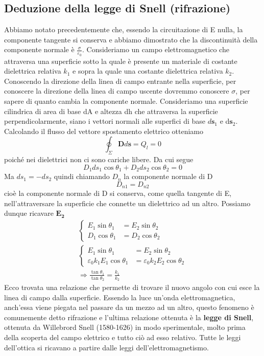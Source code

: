 \documentclass[10pt,a4paper]{article}
\begin{document}
\subsection{Deduzione della legge di Snell (rifrazione)}
Abbiamo notato precedentemente che, essendo la circuitazione di E nulla, la componente tangente si conserva e abbiamo dimostrato che la discontinuità della componente normale è $\frac{\sigma}{\varepsilon_0}$. Consideriamo un campo elettromagnetico che attraversa una superficie sotto la quale è presente un materiale di costante dielettrica relativa \(k_1\) e sopra la quale una costante dielettrica relativa \(k_2\). Conoscendo la direzione della linea di campo entrante nella superficie, per conoscere la direzione della linea di campo uscente dovremmo conoscere $\sigma$, per sapere di quanto cambia la componente normale. Consideriamo una superficie cilindrica di area di base dA e altezza dh che attraversa la superficie perpendicolarmente, siano i vettori normali alle superfici di base \(d\mathbf{s}_1\) e d\(\mathbf{s}_2\). Calcolando il flusso del vettore spostamento elettrico otteniamo
\[\oint_{\Sigma}\mathbf{D}d\mathbf{s} = Q_l = 0\]
poiché nei dielettrici non ci sono cariche libere. Da cui segue
\[D_1ds_1\cos\theta_1 + D_2ds_2\cos\theta_2 = 0\]
Ma \(ds_1 = -ds_2\) quindi chiamando \(D_n\) la componente normale di D
\[D_{n1} = D_{n2}\]
cioè la componente normale di D si conserva, come quella tangente di E, nell'attraversare la superficie che connette un dielettrico ad un altro. Possiamo dunque ricavare $\mathbf{E_2}$
\begin{align*}
	\begin{cases}
		E_1\sin\theta_1 &= E_2\sin\theta_2 \\
		D_1\cos\theta_1 &= D_2\cos\theta_2 
	\end{cases}
\\
	\begin{cases}
		E_1\sin\theta_1 &= E_2\sin\theta_2 \\
		\varepsilon_0k_1E_1\cos\theta_1 &= \varepsilon_0k_2E_2\cos\theta_2 
	\end{cases}
\\
	\Rightarrow \frac{\tan\theta_1}{\tan\theta_2} = \frac{k_1}{k_2}
\end{align*}
Ecco trovata una relazione che permette di trovare il nuovo angolo con cui esce la linea di campo dalla superficie. Essendo la luce un'onda elettromagnetica, anch'essa viene piegata nel passare da un mezzo ad un altro, questo fenomeno è comunemente detto rifrazione e l'ultima relazione ottenuta è la \textbf{legge di Snell}, ottenuta da Willebrord Snell (1580-1626) in modo sperimentale, molto prima della scoperta del campo elettrico e tutto ciò ad esso relativo. Tutte le leggi dell'ottica si ricavano a partire dalle leggi dell'elettromagnetismo. 
\end{document}
